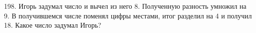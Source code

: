 198. Игорь задумал число и вычел из него 8. Полученную разность умножил на 9. В получившемся числе поменял цифры местами, итог разделил на 4 и получил 18. Какое число задумал Игорь?\\
